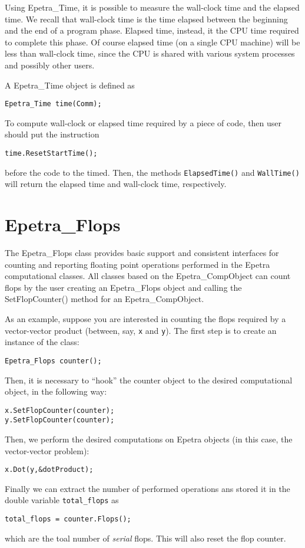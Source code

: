 Using Epetra\_Time, it is possible to measure the wall-clock time and
the elapsed time. We recall that wall-clock time is the time elapsed
between the beginning and the end of a program phase. Elapsed time,
instead, it the CPU time required to complete this phase. Of course
elapsed time (on a single CPU machine) will be less than wall-clock
time, since the CPU is shared with various system processes and possibly
other users.

A Epetra\_Time object is defined as
\begin{verbatim}
Epetra_Time time(Comm);
\end{verbatim}
To compute wall-clock or elapsed time required by a piece of code,
then user should put the instruction
\begin{verbatim}
time.ResetStartTime();
\end{verbatim}
before the code to the timed. Then, 
the methods \verb!ElapsedTime()! and \verb!WallTime()! will return the
elapsed time and wall-clock time, respectively.


\section{Epetra\_Flops}
\label{sec:flops}

The Epetra\_Flops class provides basic support and consistent interfaces
for counting and reporting floating point operations performed in the
Epetra computational classes. All classes based on the
Epetra\_CompObject can count flops by the user creating an Epetra\_Flops
object and calling the SetFlopCounter() method for an
Epetra\_CompObject.

As an example, suppose you are interested in counting the flops required
by a vector-vector product (between, say, \verb!x! and \verb!y!).  The
first step is to create an instance of the class:
\begin{verbatim}
Epetra_Flops counter();
\end{verbatim}
Then, it is necessary to ``hook'' the counter object to the desired
computational object, in the following way:
\begin{verbatim}
x.SetFlopCounter(counter);
y.SetFlopCounter(counter);
\end{verbatim}
Then, we perform the desired computations on Epetra objects (in this
case, the vector-vector problem):
\begin{verbatim}
x.Dot(y,&dotProduct);
\end{verbatim}
Finally we can extract the number of performed operations ans stored it
in the double variable \verb!total_flops! as
\begin{verbatim}
total_flops = counter.Flops();
\end{verbatim}
which are the toal number of {\sl serial} flops. This will also reset
the flop counter.


